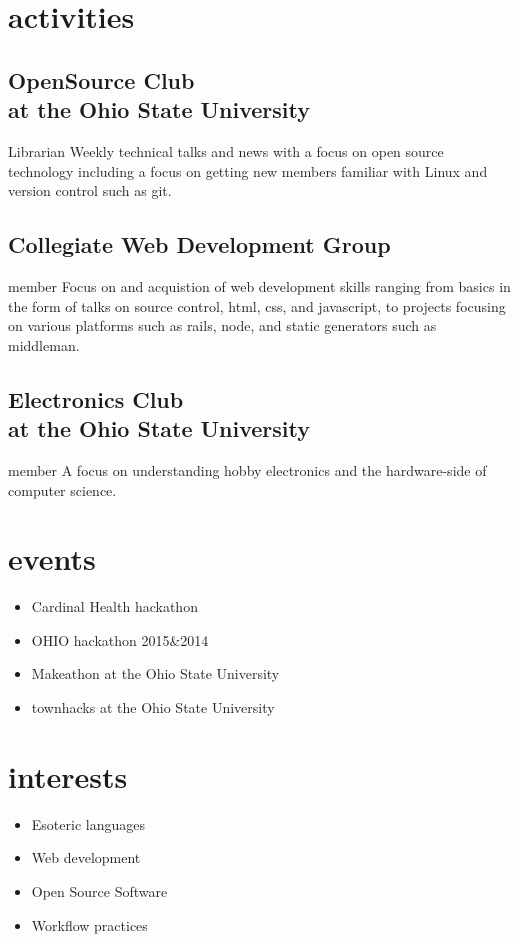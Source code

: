 \documentclass[letterpaper,6pt]{cv}
\begin{document}
	\section{activities}

	\subsection{OpenSource Club\\ at the Ohio State University}{Librarian}{}
			Weekly technical talks and news with a focus on open source technology including a focus on getting new members familiar with Linux and version control such as git.

			\subsection{Collegiate Web Development Group}{member}{}
			Focus on and acquistion of web development skills ranging from basics in the form of talks on source control, html, css, and javascript, to projects focusing on various platforms such as rails, node, and static generators such as middleman.

			\subsection{Electronics Club\\ at the Ohio State University}{member}{}
			A focus on understanding hobby electronics and the hardware-side of computer science.

	\section{events}
		\begin{itemize}
			\item Cardinal Health hackathon
			\item OHIO hackathon 2015\&2014
			\item Makeathon at the Ohio State University
			\item townhacks at the Ohio State University
		\end{itemize}

	\section{interests}
		\begin{itemize}
			\item Esoteric languages
			\item Web development
			\item Open Source Software
			\item Workflow practices
		\end{itemize}
		
\end{document}
